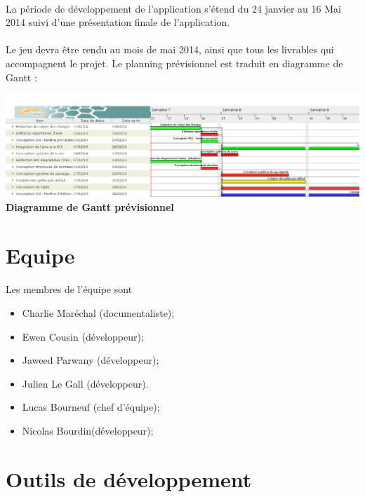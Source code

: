 	\paragraph*{}
	La période de développement de l’application s’étend du 24 janvier au 16 Mai 2014 suivi d’une présentation finale de l’application. %
	\paragraph*{}
	Le jeu devra être rendu au mois de mai 2014, ainsi que tous les livrables qui accompagnent le projet.
	Le planning prévisionnel est traduit en diagramme de Gantt :\\

	\begin{center}
		\includegraphics[scale=.6, angle=90]{data/ganttDiagram.png}\\
		\textbf{Diagramme de Gantt prévisionnel}
	\end{center}



\section {Equipe}
	\paragraph*{}
	Les membres de l'équipe sont 
	\begin{itemize}
		\item Charlie Maréchal (documentaliste);
		\item Ewen Cousin (développeur);
		\item Jaweed Parwany (développeur);
		\item Julien Le Gall (développeur).
		\item Lucas Bourneuf (chef d'équipe);
		\item Nicolas Bourdin(développeur);
	\end{itemize}



\section{Outils de développement}
